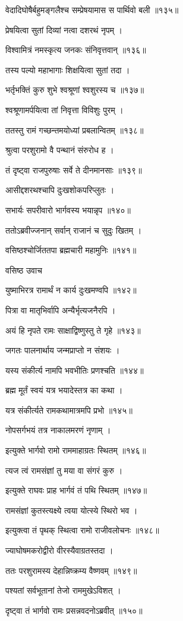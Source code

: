 वेदादिघोषैर्बहुमङ्गलैश्च सम्प्रेषयामास स पार्थिवो बली ॥१३५॥

प्रेषयित्वा सुतां दिव्यां नत्वा दशरथं नृपम् ।

विश्वामित्रं नमस्कृत्य जनकः संनिवृत्तवान् ॥१३६॥

तस्य पल्यो महाभागाः शिक्षयित्वा सुतां तदा ।

भर्तृभक्तिं कुरु शुभे श्वश्रूणां श्वशुरस्य च ॥१३७॥

श्वश्रूणामर्पयित्वा तां निवृत्ता विविशुः पुरम् ।

ततस्तु रामं गच्छन्तमयोध्यां प्रबलान्वितम् ॥१३८॥

श्रुत्वा परशुरामो वै पन्थानं संरुरोध ह ।

तं दृष्ट्वा राजपुरुषाः सर्वे ते दीनमानसाः ॥१३९॥

आसीद्दशरथश्चापि दुःखशोकपरिप्लुतः ।

सभार्यः सपरीवारो भार्गवस्य भयान्नृप ॥१४०॥

ततोऽब्रवीज्जनान् सर्वान् राजानं च सुदुः खितम् ।

वसिष्ठश्चोर्जिततपा ब्रह्मचारी महामुनिः ॥१४१॥

वसिष्ठ उवाच

युष्माभिरत्र रामार्थं न कार्य दुःखमण्वपि ॥१४२॥

पित्रा वा मातृभिर्वापि अन्यैर्भृत्यजनैरपि ।

अयं हि नृपते रामः साक्षाद्विष्णुस्तु ते गृहे ॥१४३॥

जगतः पालनार्थाय जन्मप्राप्तो न संशयः ।

यस्य संकीर्त्य नामपि भवभीतिः प्रणश्चति ॥१४४॥

ब्रह्म मूर्तं स्वयं यत्र भयादेस्तत्र का कथा ।

यत्र संकीर्त्यते रामकथामात्रमपि प्रभो ॥१४५॥

नोपसर्गभयं तत्र नाकालमरणं नृणाम् ।

इत्युक्ते भार्गवो रामो राममाहाग्रतः स्थितम् ॥१४६॥

त्यज त्वं रामसंज्ञां तु मया वा संगरं कुरु ।

इत्युक्ते राघवः प्राह भार्गवं तं पथि स्थितम् ॥१४७॥

रामसंज्ञां कुतस्त्यक्ष्ये त्वया योत्स्ये स्थिरो भव ।

इत्युक्त्वा तं पृथक् स्थित्वा रामो राजीवलोचनः ॥१४८॥

ज्याघोषमकरोद्वीरो वीरस्यैवाग्रतस्तदा ।

ततः परशुरामस्य देहान्निष्क्रम्य वैष्णवम् ॥१४९॥

पश्यतां सर्वभूतानां तेजो राममुखेऽविशत् ।

दृष्ट्वा तं भार्गवो रामः प्रसन्नवदनोऽब्रवीत् ॥१५०॥


